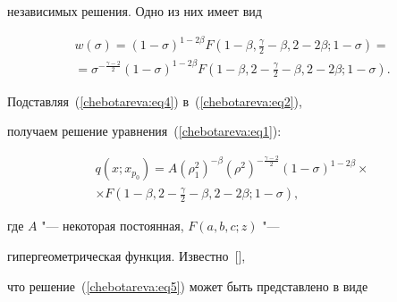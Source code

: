 независимых решения. Одно из них имеет вид


\begin{multline}


\label{chebotareva:eq4}


 w\left( \sigma \right) = \left( {1 - \sigma } \right)^{1 - 2\beta }F\left(


{1 - \beta , \frac{\gamma }{2} - \beta , 2 - 2\beta ; 1 - \sigma } \right) = \\


 = \sigma ^{ - \frac{\gamma - 2}{2}}\left( {1 - \sigma } \right)^{1 - 2\beta


}F\left( {1 - \beta , 2 - \frac{\gamma }{2} - \beta , 2 - 2\beta ; 1


- \sigma } \right).


 \end{multline}


Подставляя~(\ref{chebotareva:eq4}) в~(\ref{chebotareva:eq2}), 


получаем решение уравнения~(\ref{chebotareva:eq1}):


\begin{multline}


\label{chebotareva:eq5} q\left( {x; x_{p_0 } } \right) = A\left(


{\rho _1^2 } \right)^{ - \beta }\left( {\rho ^2} \right)^{ -


\frac{\gamma - 2}{2}}\left( {1 - \sigma } \right)^{1 - 2\beta


}\times\\\times


F\left( {1 - \beta,  2 - \frac{\gamma }{2} - \beta,  2 - 2\beta ;  1- \sigma } \right), 


\end{multline}


где $A$ "--- некоторая постоянная,  $F\left( {a, b, c; z} \right)$ "---


гипергеометрическая функция. Известно~[], 


что решение~(\ref{chebotareva:eq5}) может быть представлено в виде


